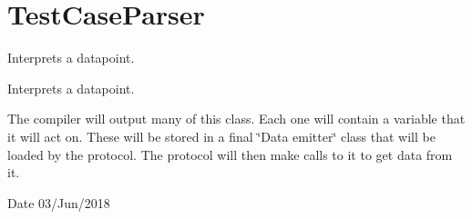 \hypertarget{group__testCaseParser}{}\section{Test\+Case\+Parser}
\label{group__testCaseParser}


Interprets a datapoint.  


Interprets a datapoint. 

The compiler will output many of this class. Each one will contain a variable that it will act on. These will be stored in a final \char`\"{}\+Data emitter\char`\"{} class that will be loaded by the protocol. The protocol will then make calls to it to get data from it.

\begin{DoxyDate}{Date}
03/\+Jun/2018 
\end{DoxyDate}
